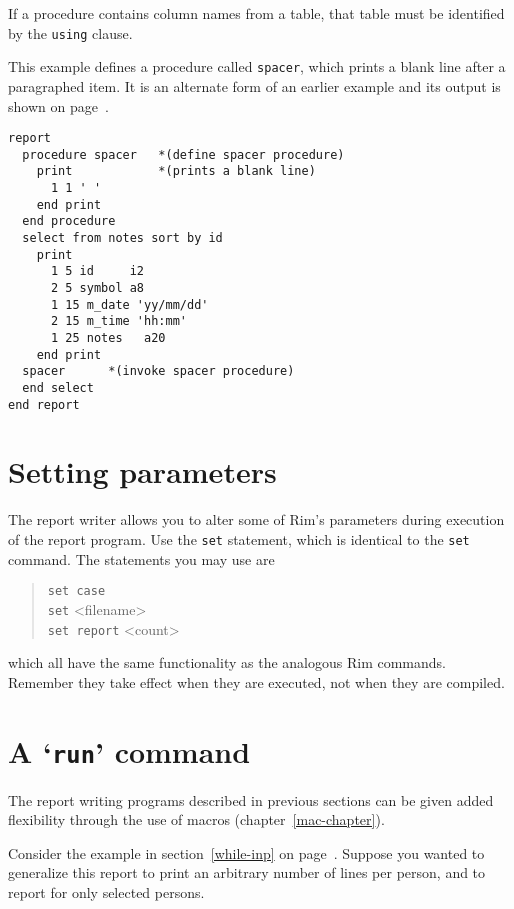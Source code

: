 \documentclass[11pt,a4paper]{report}
\begin{document}
If a procedure contains column names from a table,
that table must be identified by the \verb!using! clause.
 
 
\demobreak
This example defines a procedure called \verb!spacer!, which prints a blank
line after a paragraphed item.
It is an alternate form of an earlier example and
its output is shown on
page~\pageref{para-demo}.
\demobreak
\begin{verbatim}
report
  procedure spacer   *(define spacer procedure)
    print            *(prints a blank line)
      1 1 ' '
    end print
  end procedure
  select from notes sort by id
    print
      1 5 id     i2
      2 5 symbol a8
      1 15 m_date 'yy/mm/dd'
      2 15 m_time 'hh:mm'
      1 25 notes   a20
    end print
  spacer      *(invoke spacer procedure)
  end select
end report
\end{verbatim}
 
 
\section{Setting parameters}
%
The report writer allows you to alter some of Rim's parameters
during execution of the report program.
Use the \verb!set! statement, which is identical to the
\verb!set! command.  The statements you may use are
\begin{verse}
  \verb!set case!  \\
  \verb!set!  <filename> \\
  \verb!set report!  <count>
\end{verse}
which all have the same functionality as the analogous Rim commands.
Remember they take effect when they are executed, not when
they are compiled.
 
 
\section{A `{\tt run}' command}
\label{run-mac}
The report writing programs described in previous sections
can be given added flexibility through the use of macros
(chapter~\ref{mac-chapter}).
 
Consider the example in section~\ref{while-inp}
on page~\pageref{while-inp}.
Suppose you wanted to generalize this report to print
an arbitrary number of lines per person, and
to report for only selected persons.
 
\end{document}

